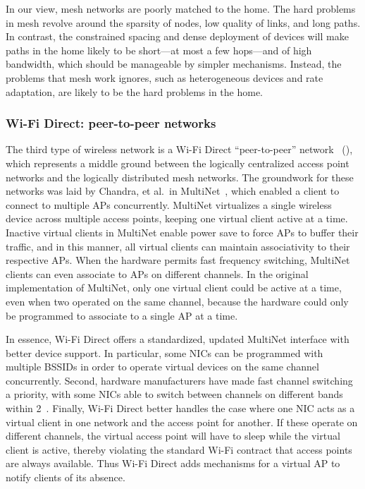 In our view, mesh networks are poorly matched to the home. The hard problems in mesh revolve around the sparsity of nodes, low quality of links, and long paths. In contrast, the constrained spacing and dense deployment of devices will make paths in the home likely to be short---at most a few hops---and of high bandwidth, which should be manageable by simpler mechanisms. Instead, the problems that mesh work ignores, such as heterogeneous devices and rate adaptation, are likely to be the hard problems in the home.
 
\subsubsection{Wi-Fi Direct: peer-to-peer networks}
The third type of wireless network is a Wi-Fi Direct ``peer-to-peer'' network~\cite{wifi_direct} (), which represents a middle ground between the logically centralized access point networks and the logically distributed mesh networks. The groundwork for these networks was laid by Chandra, et al.\ in MultiNet~\cite{chandra_multinet}, which enabled a client to connect to multiple APs concurrently. MultiNet virtualizes a single wireless device across multiple access points, keeping one virtual client active at a time. Inactive virtual clients in MultiNet enable power save to force APs to buffer their traffic, and in this manner, all virtual clients can maintain associativity to their respective APs. When the hardware permits fast frequency switching, MultiNet clients can even associate to APs on different channels. In the original implementation of MultiNet, only one virtual client could be active at a time, even when two operated on the same channel, because the hardware could only be programmed to associate to a single AP at a time.

In essence, Wi-Fi Direct offers a standardized, updated MultiNet interface with better device support. In particular, some NICs can be programmed with multiple BSSIDs in order to operate virtual devices on the same channel concurrently. Second, hardware manufacturers have made fast channel switching a priority, with some NICs able to switch between channels on different bands within 2\ms~\cite{atheros_ar9390}. Finally, Wi-Fi Direct better handles the case where one NIC acts as a virtual client in one network and the access point for another. If these operate on different channels, the virtual access point will have to sleep while the virtual client is active, thereby violating the standard Wi-Fi contract that access points are always available. Thus Wi-Fi Direct adds mechanisms for a virtual AP to notify clients of its absence.


